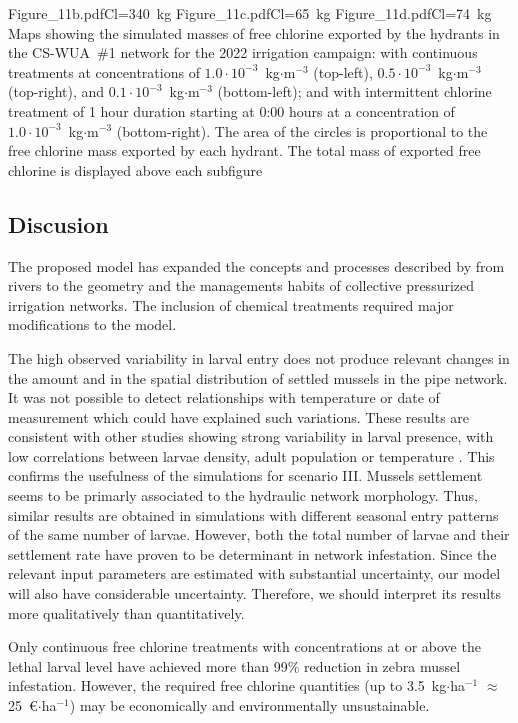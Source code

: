 \documentclass[review,authoryear]{elsarticle}
\begin{document}
{Figure_11b.pdf}{Cl=340~kg}
{Figure_11c.pdf}{Cl=65~kg}
{Figure_11d.pdf}{Cl=74~kg}
{Maps showing the simulated masses of free chlorine exported by the hydrants in
the CS-WUA~\#1 network for the 2022 irrigation campaign: with continuous
treatments at concentrations of $1.0\cdot10^{-3}$~kg$\cdot$m$^{-3}$ (top-left),
$0.5\cdot10^{-3}$~kg$\cdot$m$^{-3}$ (top-right),  and
$0.1\cdot10^{-3}$~kg$\cdot$m$^{-3}$ (bottom-left); and with intermittent
chlorine treatment of 1 hour duration starting at 0:00 hours at a
concentration of $1.0\cdot10^{-3}$~kg$\cdot$m$^{-3}$ (bottom-right). The area of
the circles is proportional to the free chlorine mass exported by each hydrant.
The total mass of exported free chlorine is displayed above each subfigure
\label{FigExportChlorine}}

\subsection{Discusion}

The proposed model has expanded the concepts and processes described by
\citet{JinZhao21} from rivers to the geometry and the managements habits of
collective pressurized irrigation networks. The inclusion of chemical treatments
required major modifications to the model.

The high observed variability in larval entry does not produce relevant changes
in the amount and in the spatial distribution of settled mussels in the pipe
network. It was not possible to
detect relationships with temperature or date of measurement which could have
explained such variations. These results are consistent with other studies
showing strong variability in larval presence, with low correlations between
larvae density, adult population or temperature \citep{Alix16, AlonzoMoya21}.
This confirms the usefulness of the simulations for scenario III.
Mussels settlement seems to be primarly associated to the hydraulic
network morphology. Thus, similar results are obtained in simulations with
different seasonal entry patterns of the same number of larvae. However, both
the total number of larvae and their settlement rate have proven to be
determinant in network infestation. Since the relevant input parameters are
estimated with substantial uncertainty, our model will also have considerable
uncertainty. Therefore, we should interpret its results more qualitatively than
quantitatively.

Only continuous free chlorine treatments with concentrations at or above the
lethal larval level have achieved more than 99\% reduction in zebra mussel
infestation. However, the required free chlorine quantities (up to
3.5~kg$\cdot$ha$^{-1}$ $\approx$ 25~\euro{}$\cdot$ha$^{-1}$)  may be
economically and environmentally unsustainable.
\end{document}
